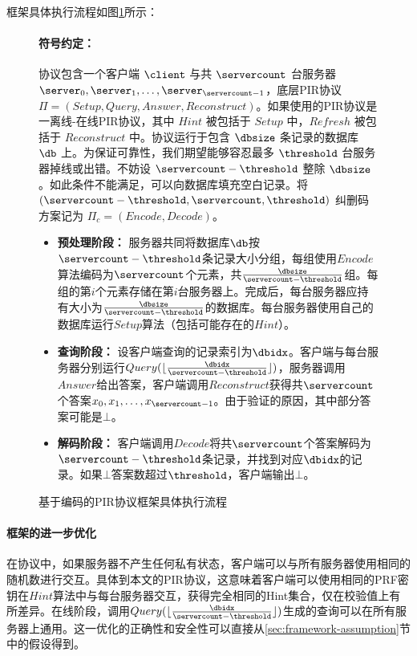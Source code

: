 框架具体执行流程如图\ref{fig:framework-protocol}所示：
\begin{figure}
    \begin{mdframed}
        \paragraph{符号约定：} 协议包含一个客户端 $\client$ 与共 $\servercount$ 台服务器 $\server_0, \server_1, \dots, \server_{\servercount-1}$，底层PIR协议 $\Pi = (Setup, Query, Answer, Reconstruct)$。如果使用的PIR协议是一离线-在线PIR协议，其中 $Hint$ 被包括于 $Setup$ 中，$Refresh$ 被包括于 $Reconstruct$ 中。协议运行于包含 $\dbsize$ 条记录的数据库 $\db$ 上。为保证可靠性，我们期望能够容忍最多 $\threshold$ 台服务器掉线或出错。不妨设 $\servercount - \threshold$ 整除 $\dbsize$。如此条件不能满足，可以向数据库填充空白记录。将 $(\servercount - \threshold, \servercount, \threshold)$ 纠删码方案记为 $\Pi_c = (Encode, Decode)$。

        \begin{itemize}
            \item \textbf{预处理阶段：} 服务器共同将数据库$\db$按$\servercount-\threshold$条记录大小分组，每组使用$Encode$算法编码为$\servercount$个元素，共$\frac{\dbsize}{\servercount-\threshold}$组。每组的第$i$个元素存储在第$i$台服务器上。完成后，每台服务器应持有大小为$\frac{\dbsize}{\servercount-\threshold}$的数据库。每台服务器使用自己的数据库运行$Setup$算法（包括可能存在的$Hint$）。
            \item \textbf{查询阶段：} 设客户端查询的记录索引为$\dbidx$。客户端与每台服务器分别运行$Query(\lfloor\frac{\dbidx}{\servercount-\threshold}\rfloor)$，服务器调用$Answer$给出答案，客户端调用$Reconstruct$获得共$\servercount$个答案$x_0, x_1, \dots, x_{\servercount-1}$。由于验证的原因，其中部分答案可能是$\bot$。
            \item \textbf{解码阶段：} 客户端调用$Decode$将共$\servercount$个答案解码为$\servercount-\threshold$条记录，并找到对应$\dbidx$的记录。如果$\bot$答案数超过$\threshold$，客户端输出$\bot$。
        \end{itemize}
    \end{mdframed}
    \caption{基于编码的PIR协议框架具体执行流程}
    \label{fig:framework-protocol}
\end{figure}

\paragraph{框架的进一步优化}
在协议中，如果服务器不产生任何私有状态，客户端可以与所有服务器使用相同的随机数进行交互。具体到本文的PIR协议，这意味着客户端可以使用相同的PRF密钥在$Hint$算法中与每台服务器交互，获得完全相同的Hint集合，仅在校验值上有所差异。在线阶段，调用$Query(\lfloor\frac{\dbidx}{\servercount-\threshold}\rfloor)$生成的查询可以在所有服务器上通用。这一优化的正确性和安全性可以直接从\ref{sec:framework-assumption}节中的假设得到。


